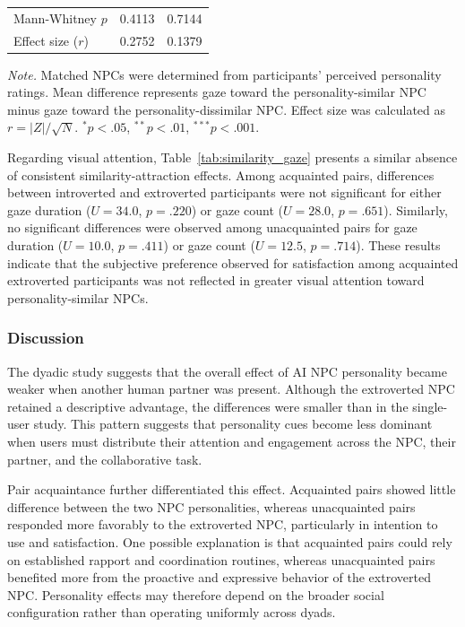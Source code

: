 \documentclass[a4paper,fleqn]{cas-sc}
\begin{document}
\begin{table}[t]
\begin{subtable}[t]{\textwidth}
\begin{tabular}{lcc}
Mann-Whitney $p$
& 0.4113 & 0.7144 \\

Effect size ($r$)
& 0.2752 & 0.1379 \\
\bottomrule
\end{tabular}
\end{subtable}

\vspace{2mm}

\begin{minipage}{0.98\textwidth}
\footnotesize
\textit{Note.} Matched NPCs were determined from participants' perceived personality ratings.
Mean difference represents gaze toward the personality-similar NPC minus gaze toward the personality-dissimilar NPC.
Effect size was calculated as $r = |Z|/\sqrt{N}$.
$^{*}p < .05$, $^{**}p < .01$, $^{***}p < .001$.
\end{minipage}

\end{table}

Regarding visual attention, Table~\ref{tab:similarity_gaze} presents a similar absence of consistent similarity-attraction effects. Among acquainted pairs, differences between introverted and extroverted participants were not significant for either gaze duration ($U=34.0$, $p=.220$) or gaze count ($U=28.0$, $p=.651$). Similarly, no significant differences were observed among unacquainted pairs for gaze duration ($U=10.0$, $p=.411$) or gaze count ($U=12.5$, $p=.714$). These results indicate that the subjective preference observed for satisfaction among acquainted extroverted participants was not reflected in greater visual attention toward personality-similar NPCs.

\subsubsection{Discussion}

The dyadic study suggests that the overall effect of AI NPC personality became weaker when another human partner was present. Although the extroverted NPC retained a descriptive advantage, the differences were smaller than in the single-user study. This pattern suggests that personality cues become less dominant when users must distribute their attention and engagement across the NPC, their partner, and the collaborative task.

Pair acquaintance further differentiated this effect. Acquainted pairs showed little difference between the two NPC personalities, whereas unacquainted pairs responded more favorably to the extroverted NPC, particularly in intention to use and satisfaction. One possible explanation is that acquainted pairs could rely on established rapport and coordination routines, whereas unacquainted pairs benefited more from the proactive and expressive behavior of the extroverted NPC. Personality effects may therefore depend on the broader social configuration rather than operating uniformly across dyads.
\end{document}
